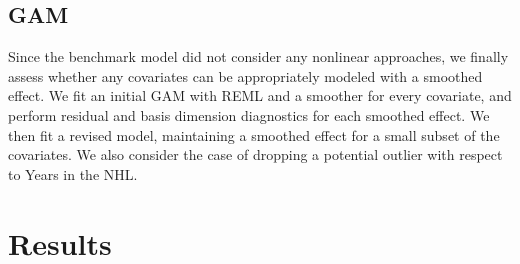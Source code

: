 \documentclass[10pt]{article}
\begin{document}
\subsection{GAM}
Since the benchmark model did not consider any nonlinear approaches, we finally assess whether any covariates can be appropriately modeled with a smoothed effect. We fit an initial GAM with REML and a smoother for every covariate, and perform residual and basis dimension diagnostics for each smoothed effect. We then fit a revised model, maintaining a smoothed effect for a small subset of the covariates. We also consider the case of dropping a potential outlier with respect to Years in the NHL.

\section{Results}
\end{document}
